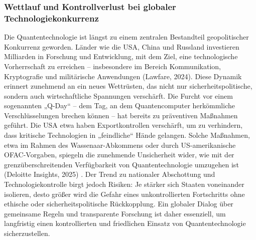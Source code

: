 \subsubsection{Wettlauf und Kontrollverlust bei globaler Technologiekonkurrenz}
Die Quantentechnologie ist längst zu einem zentralen Bestandteil geopolitischer Konkurrenz geworden. Länder wie die USA, China und Russland investieren Milliarden in Forschung und Entwicklung, mit dem Ziel, eine technologische Vorherrschaft zu erreichen – insbesondere im Bereich Kommunikation, Kryptografie und militärische Anwendungen (Lawfare, 2024)\cite{howell_restrict_2023}. Diese Dynamik erinnert zunehmend an ein neues Wettrüsten, das nicht nur sicherheitspolitische, sondern auch wirtschaftliche Spannungen verschärft.
Die Furcht vor einem sogenannten „Q-Day“ – dem Tag, an dem Quantencomputer herkömmliche Verschlüsselungen brechen können – hat bereits zu präventiven Maßnahmen geführt. Die USA etwa haben Exportkontrollen verschärft, um zu verhindern, dass kritische Technologien in „feindliche“ Hände gelangen. Solche Maßnahmen, etwa im Rahmen des Wassenaar-Abkommens oder durch US-amerikanische OFAC-Vorgaben, spiegeln die zunehmende Unsicherheit wider, wie mit der grenzüberschreitenden Verfügbarkeit von Quantentechnologie umzugehen ist (Deloitte Insights, 2025) \cite{buchholz_quantum_nodate}.
Der Trend zu nationaler Abschottung und Technologiekontrolle birgt jedoch Risiken: Je stärker sich Staaten voneinander isolieren, desto größer wird die Gefahr eines unkontrollierten Fortschritts ohne ethische oder sicherheitspolitische Rückkopplung. Ein globaler Dialog über gemeinsame Regeln und transparente Forschung ist daher essenziell, um langfristig einen kontrollierten und friedlichen Einsatz von Quantentechnologie sicherzustellen.

